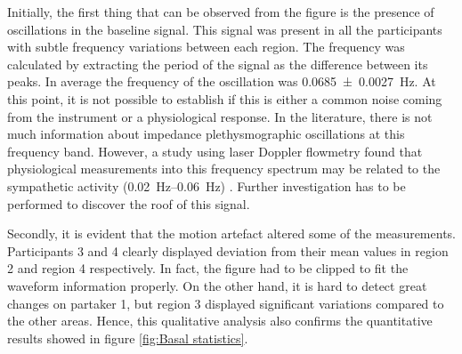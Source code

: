 Initially, the first thing that can be observed from the figure is the presence of oscillations in the baseline signal. This signal was present in all the participants with subtle frequency variations between each region. The frequency was calculated by extracting the period of the signal as the difference between its peaks. In average the frequency of the oscillation was \SI{0.0685(00027)}{\hertz}. At this point, it is not possible to establish if this is either a common noise coming from the instrument or a physiological response. In the literature, there is not much information about impedance plethysmographic oscillations at this frequency band.  However, a study using laser Doppler flowmetry found that physiological measurements into this frequency spectrum may be related to the sympathetic activity (\SIrange{0.02}{0.06}{\hertz}) \cite{kvandal2006low}. Further investigation has to be performed to discover the roof of this signal. 

Secondly, it is evident that the motion artefact altered some of the measurements. Participants 3 and 4 clearly displayed deviation from their mean values in region 2 and region 4 respectively. In fact, the figure had to be clipped to fit the waveform information properly. On the other hand, it is hard to detect great changes on partaker 1, but region 3 displayed significant variations compared to the other areas. Hence, this qualitative analysis also confirms the quantitative results showed in figure \ref{fig:Basal statistics}.  

